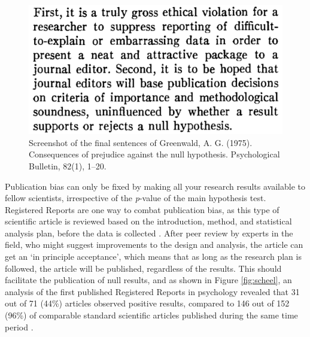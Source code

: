 \documentclass[
  oneside]{krantz}
\begin{document}
\begin{figure}

{\centering \includegraphics[width=1\linewidth]{images/greenwald} 

}

\caption{Screenshot of the final sentences of Greenwald, A. G. (1975). Consequences of prejudice against the null hypothesis. Psychological Bulletin, 82(1), 1--20.}\label{fig:greenwald}
\end{figure}

Publication bias can only be fixed by making all your research results available to fellow scientists, irrespective of the \emph{p}-value of the main hypothesis test. Registered Reports are one way to combat publication bias, as this type of scientific article is reviewed based on the introduction, method, and statistical analysis plan, before the data is collected \citep{chambers_past_2022, nosek_registered_2014}. After peer review by experts in the field, who might suggest improvements to the design and analysis, the article can get an `in principle acceptance', which means that as long as the research plan is followed, the article will be published, regardless of the results. This should facilitate the publication of null results, and as shown in Figure \ref{fig:scheel}, an analysis of the first published Registered Reports in psychology revealed that 31 out of 71 (44\%) articles observed positive results, compared to 146 out of 152 (96\%) of comparable standard scientific articles published during the same time period \citep{scheel_excess_2021}.
\end{document}
